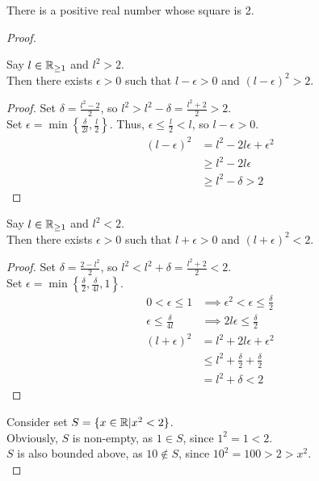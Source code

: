 \documentclass[a4paper]{article}
\begin{document}
\begin{eg}
There is a positive real number whose square is 2.
\end{eg}
\begin{proof}
\begin{nlemma}\label{l2 > 2}
Say $l \in \mathbb{R}_{\geq 1}$ and $l^2 > 2$.\\
Then there exists $\epsilon > 0$ such that $l - \epsilon > 0$ and $(l - \epsilon)^2 > 2$.
\end{nlemma}
\begin{proof}
Set $\delta = \frac{l^2 - 2}{2}$, so $l^2 > l^2 - \delta = \frac{l^2 + 2}{2} > 2$.\\
Set $\epsilon = \min{\left\{\frac{\delta}{2l}, \frac{l}{2} \right\}}$.
Thus, $\epsilon \leq \frac{l}{2} < l$, so $l - \epsilon > 0$.
\begin{align*}
	(l - \epsilon)^2 &= l^2 - 2l\epsilon + \epsilon^2 \\
	&\geq l^2 - 2l\epsilon \\
	&\geq l^2 - \delta > 2
\end{align*}
\end{proof}
\begin{nlemma}\label{l2 < 2}
Say $l \in \mathbb{R}_{\geq 1}$ and $l^2 < 2$.\\
Then there exists $\epsilon > 0$ such that $l + \epsilon > 0$ and $(l + \epsilon)^2 < 2$.
\end{nlemma}
\begin{proof}
Set $\delta = \frac{2 - l^2}{2}$, so $l^2 < l^2 + \delta = \frac{l^2 + 2}{2} < 2$.\\
Set $\epsilon = \min{\left\{ \frac{\delta}{2}, \frac{\delta}{4l}, 1\right\}}$.
\begin{align*}
	0 < \epsilon \leq 1 &\implies \epsilon^2 < \epsilon \leq \frac{\delta}{2}\\
	\epsilon \leq \frac{\delta}{4l} &\implies 2l\epsilon \leq \frac{\delta}{2}
\end{align*}
\begin{align*}
	(l + \epsilon)^2 &= l^2 + 2l\epsilon + \epsilon^2 \\
	&\leq l^2 + \frac{\delta}{2} + \frac{\delta}{2} \\
	&= l^2 + \delta < 2
\end{align*}
\end{proof}
Consider set $S = \{x \in \mathbb{R} | x^2 < 2\}$.\\
Obviously, $S$ is non-empty, as $1 \in S$, since $1^2 = 1 < 2$.\\
$S$ is also bounded above, as $10 \notin S$, since $10^2 = 100 > 2 > x^2$.\\

\end{proof}
\end{document}
